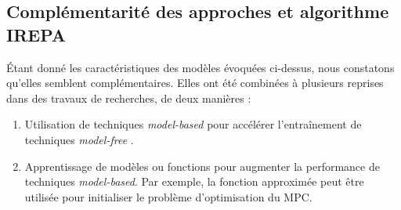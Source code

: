 \documentclass[a4paper,12pt]{report}
\begin{document}
\subsection{Complémentarité des approches et algorithme IREPA}
Étant donné les caractéristiques des modèles évoquées ci-dessus, nous constatons qu'elles semblent complémentaires. Elles ont été combinées à plusieurs reprises dans des travaux de recherches, de deux manières : 
\begin{enumerate}
\item Utilisation de techniques \textit{model-based} pour accélérer l'entraînement de techniques \textit{model-free} \cite{combining_mpc_rl}.

\item Apprentissage de modèles ou fonctions pour augmenter la performance de techniques \textit{model-based}. Par exemple, la fonction approximée peut être utilisée pour initialiser le problème d'optimisation du MPC.
\end{enumerate}
\end{document}
